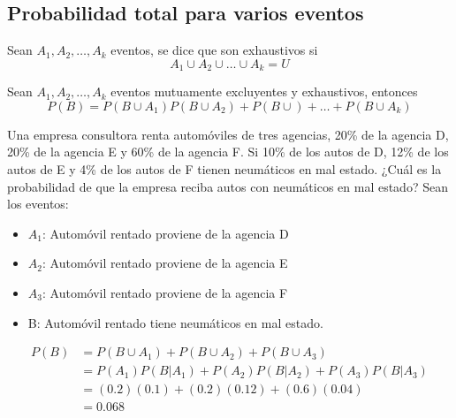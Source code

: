 \subsection{Probabilidad total para varios eventos}
\begin{definicion}
    Sean $A_1,A_2,\dots,A_k$ eventos, se dice que son exhaustivos si
    \begin{equation*}
        A_1 \cup A_2 \cup \dots \cup A_k =U
    \end{equation*}
\end{definicion}
Sean $A_1,A_2,\dots,A_k$ eventos mutuamente excluyentes y exhaustivos, entonces
\begin{equation*}
    P(B)=P(B\cup A_1) P(B\cup A_2)+P(B\cup)+\dots+P(B\cup A_k)
\end{equation*}
\begin{ejemplo}
    Una empresa consultora renta automóviles de tres agencias, 20\% de la agencia D, 20\% de la agencia E y 60\% de la agencia F. Si 10\% de los autos de D, 12\% de los autos de E y 4\% de los autos de F tienen neumáticos en mal estado. ¿Cuál es la probabilidad de que la empresa reciba autos con neumáticos en mal estado?
    Sean los eventos:
    \begin{itemize}
        \item $A_1$: Automóvil rentado proviene de la agencia D
        \item $A_2$: Automóvil rentado proviene de la agencia E
        \item $A_3$: Automóvil rentado proviene de la agencia F
        \item B: Automóvil rentado tiene neumáticos en mal estado.
    \end{itemize}
    \begin{align*}
        P(B) & =P(B\cup A_1)+P(B\cup A_2)+P(B\cup A_3)       \\
             & =P(A_1)P(B|A_1)+P(A_2)P(B|A_2)+P(A_3)P(B|A_3) \\
             & =(0.2)(0.1)+(0.2)(0.12)+(0.6)(0.04)           \\
             & =0.068
    \end{align*}
\end{ejemplo}

